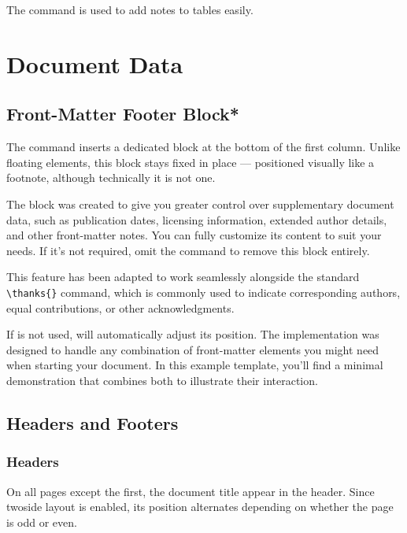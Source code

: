 \documentclass[9pt,a4paper,twocolumn,twoside]{tau-class/tau}
\begin{document}
        The \inlinecode{\tabletext{}} command is used to add notes to tables easily. 

\section{Document Data}

    \subsection{Front-Matter Footer Block*}

        The \inlinecode{\docinfo{}} command inserts a dedicated block at the bottom of the first column. Unlike floating elements, this block stays fixed in place — positioned visually like a footnote, although technically it is not one.
    
        The \inlinecode{\docinfo{}} block was created to give you greater control over supplementary document data, such as publication dates, licensing information, extended author details, and other front-matter notes. You can fully customize its content to suit your needs. If it’s not required, omit the command to remove this block entirely.
    
        \begin{note}
            This feature has been adapted to work seamlessly alongside the standard \verb|\thanks{}| command, which is commonly used to indicate corresponding authors, equal contributions, or other acknowledgments.
        \end{note}
    
        If \inlinecode{\thanks{}} is not used, \inlinecode{\docinfo{}} will automatically adjust its position. The implementation was designed to handle any combination of front-matter elements you might need when starting your document. In this example template, you’ll find a minimal demonstration that combines both to illustrate their interaction.

    \subsection{Headers and Footers}

        \subsubsection{Headers}

            On all pages except the first, the document title appear in the header. Since twoside layout is enabled, its position alternates depending on whether the page is odd or even.
\end{document}
